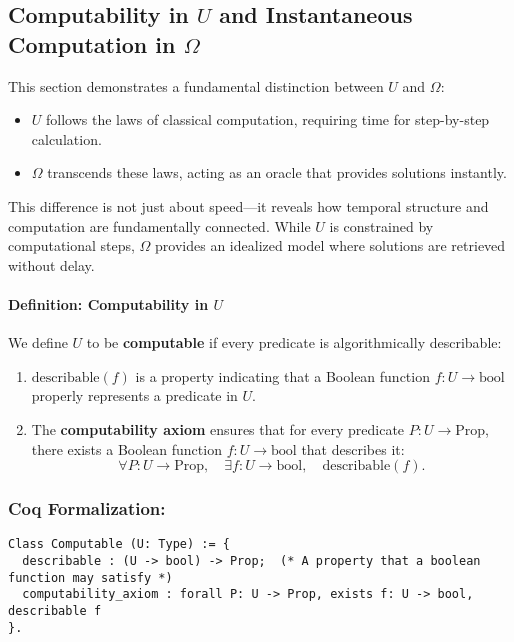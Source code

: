 \documentclass[12pt]{article}
\begin{document}
\subsection{Computability in \( U \) and Instantaneous Computation in \( \Omega \)}

This section demonstrates a fundamental distinction between \( U \) and \( \Omega \):

\begin{itemize}
    \item \( U \) follows the laws of classical computation, requiring time for step-by-step calculation.
    \item \( \Omega \) transcends these laws, acting as an oracle that provides solutions instantly.
\end{itemize}

This difference is not just about speed—it reveals how temporal structure and computation are fundamentally connected. While \( U \) is constrained by computational steps, \( \Omega \) provides an idealized model where solutions are retrieved without delay.

\paragraph{Definition: Computability in \( U \)}
We define \( U \) to be \textbf{computable} if every predicate is algorithmically describable:

\begin{enumerate}
    \item \( \text{describable}(f) \) is a property indicating that a Boolean function \( f: U \to \text{bool} \) properly represents a predicate in \( U \).
    \item The \textbf{computability axiom} ensures that for every predicate \( P: U \to \text{Prop} \), there exists a Boolean function \( f: U \to \text{bool} \) that describes it:
    \begin{equation}
        \forall P: U \to \text{Prop}, \quad \exists f: U \to \text{bool}, \quad \text{describable}(f).
    \end{equation}
\end{enumerate}

\subsubsection{Coq Formalization:}
\begin{lstlisting}[language=Coq]
Class Computable (U: Type) := {
  describable : (U -> bool) -> Prop;  (* A property that a boolean function may satisfy *)
  computability_axiom : forall P: U -> Prop, exists f: U -> bool, describable f
}.
\end{lstlisting}
\end{document}
